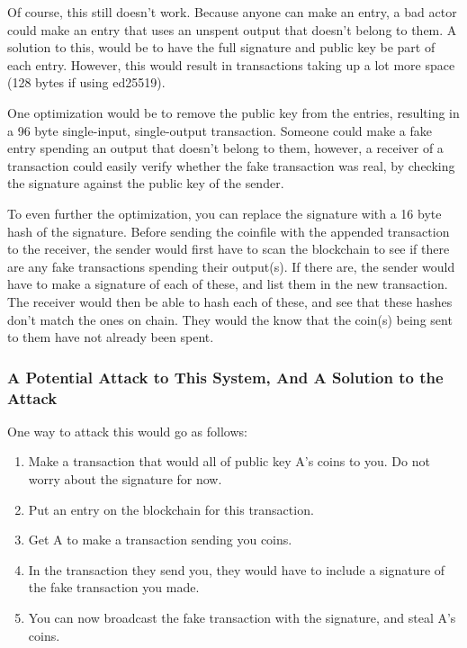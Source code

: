 \documentclass[12pt, letterpaper]{article}
\begin{document}
Of course, this still doesn't work. Because anyone can make an entry, a bad
actor could make an entry that uses an unspent output that doesn't belong to
them. A solution to this, would be to have the full signature and public key be
part of each entry. However, this would result in transactions taking up a lot
more space (128 bytes if using ed25519).

One optimization would be to remove the public key from the entries, resulting
in a 96 byte single-input, single-output transaction. Someone could make a fake
entry spending an output that doesn't belong to them, however, a receiver of a
transaction could easily verify whether the fake transaction was real, by
checking the signature against the public key of the sender.

To even further the optimization, you can replace the signature with a 16 byte
hash of the signature. Before sending the coinfile with the appended transaction
to the receiver, the sender would first have to scan the blockchain to see if
there are any fake transactions spending their output(s). If there are, the
sender would have to make a signature of each of these, and list them in the new
transaction. The receiver would then be able to hash each of these, and see that
these hashes don't match the ones on chain. They would the know that the coin(s)
being sent to them have not already been spent.

\subsubsection{A Potential Attack to This System, And A Solution to the Attack}
One way to attack this would go as follows:

\begin{enumerate}
    \item Make a transaction that would all of public key A's coins to you.
        Do not worry about the signature for now.
    \item Put an entry on the blockchain for this transaction.
    \item Get A to make a transaction sending you coins.
    \item In the transaction they send you, they would have to include a
        signature of the fake transaction you made.
    \item You can now broadcast the fake transaction with the signature, and
        steal A's coins.
\end{enumerate}
\end{document}
